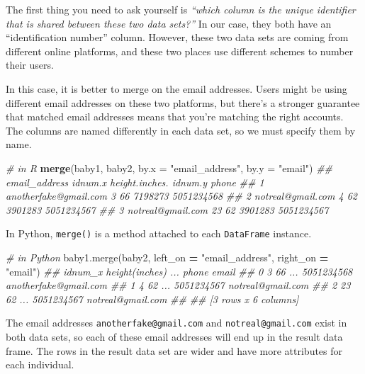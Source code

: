 \documentclass[12pt,krantz2]{krantz}
\makeatletter
\newenvironment{Shaded}{\begin{snugshade}}{\end{snugshade}}
\newcommand{\CommentTok}[1]{\textcolor[rgb]{0.37,0.37,0.37}{\textit{#1}}}
\newcommand{\DataTypeTok}[1]{\textcolor[rgb]{0.27,0.27,0.27}{#1}}
\newcommand{\KeywordTok}[1]{\textcolor[rgb]{0.27,0.27,0.27}{\textbf{#1}}}
\newcommand{\NormalTok}[1]{#1}
\newcommand{\OperatorTok}[1]{\textcolor[rgb]{0.43,0.43,0.43}{\textbf{#1}}}
\newcommand{\StringTok}[1]{\textcolor[rgb]{0.5,0.5,0.5}{#1}}
\newenvironment{kframe}{%
\medskip{}
\setlength{\fboxsep}{.8em}
 \def\at@end@of@kframe{}%
 \ifinner\ifhmode%
  \def\at@end@of@kframe{\end{minipage}}%
  \begin{minipage}{\columnwidth}%
 \fi\fi%
 \def\FrameCommand##1{\hskip\@totalleftmargin \hskip-\fboxsep
 \colorbox{shadecolor}{##1}\hskip-\fboxsep
     \hskip-\linewidth \hskip-\@totalleftmargin \hskip\columnwidth}%
 \MakeFramed {\advance\hsize-\width
   \@totalleftmargin\z@ \linewidth\hsize
   \@setminipage}}%
 {\par\unskip\endMakeFramed%
 \at@end@of@kframe}
\renewenvironment{Shaded}{\begin{kframe}}{\end{kframe}}
\makeatother
\begin{document}
The first thing you need to ask yourself is \emph{``which column is the unique identifier that is shared between these two data sets?''} In our case, they both have an ``identification number'' column. However, these two data sets are coming from different online platforms, and these two places use different schemes to number their users.

In this case, it is better to merge on the email addresses. Users might be using different email addresses on these two platforms, but there's a stronger guarantee that matched email addresses means that you're matching the right accounts. The columns are named differently in each data set, so we must specify them by name.

\begin{Shaded}
\begin{Highlighting}[]
\CommentTok{# in R}
\KeywordTok{merge}\NormalTok{(baby1, baby2, }\DataTypeTok{by.x =} \StringTok{"email_address"}\NormalTok{, }\DataTypeTok{by.y =} \StringTok{"email"}\NormalTok{)}
\CommentTok{##           email_address idnum.x height.inches. idnum.y      phone}
\CommentTok{## 1 anotherfake@gmail.com       3             66 7198273 5051234568}
\CommentTok{## 2     notreal@gmail.com       4             62 3901283 5051234567}
\CommentTok{## 3     notreal@gmail.com      23             62 3901283 5051234567}
\end{Highlighting}
\end{Shaded}

In Python, \texttt{merge()} is a method attached to each \texttt{DataFrame} instance.

\begin{Shaded}
\begin{Highlighting}[]
\CommentTok{# in Python}
\NormalTok{baby1.merge(baby2, left_on }\OperatorTok{=} \StringTok{"email_address"}\NormalTok{, right_on }\OperatorTok{=} \StringTok{"email"}\NormalTok{)}
\CommentTok{##    idnum_x  height(inches)  ...       phone                  email}
\CommentTok{## 0        3              66  ...  5051234568  anotherfake@gmail.com}
\CommentTok{## 1        4              62  ...  5051234567      notreal@gmail.com}
\CommentTok{## 2       23              62  ...  5051234567      notreal@gmail.com}
\CommentTok{## }
\CommentTok{## [3 rows x 6 columns]}
\end{Highlighting}
\end{Shaded}

The email addresses \texttt{anotherfake@gmail.com} and \texttt{notreal@gmail.com} exist in both data sets, so each of these email addresses will end up in the result data frame. The rows in the result data set are wider and have more attributes for each individual.
\end{document}
